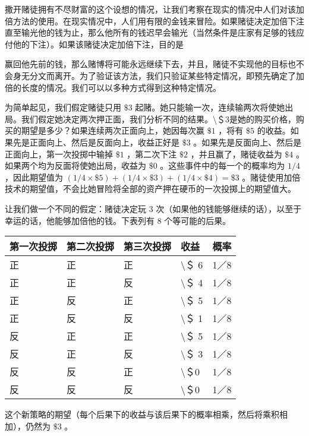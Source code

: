 撒开赌徒拥有不尽财富的这个设想的情况，让我们考察在现实的情况中人们对该加倍方法的使用。在现实情况中，人们用有限的金钱来冒险。如果赌徒决定加倍下注直至输光他的钱为止，那么他所有的钱迟早会输光（当然条件是庄家有足够的钱应付他的下注）。如果该赌徒决定加倍下注，目的是

赢回他先前的钱，那么赌博将可能永远继续下去，并且，赌徒不实现他的目标也不会身无分文而离开。为了验证该方法，我们只验证某些特定情况，即预先确定了加倍的长度的情况。我们可以以多种方式得到这种特定情况。

为简单起见，我们假定赌徒只用 $\$ 3$ 起赌。她只能输一次，连续输两次将使她出局。我们假定她决定两次押正面，我们分析不同的结果。\textbackslash ＄3是她的购买价格，购买的期望是多少？如果连续两次正面向上，她因每次赢 $\$ 1$ ，将有 $\$ 5$ 的收益。如果先是正面向上、然后是反面向上，收益正好是 $\$ 3$ 。如果先是反面向上、然后是正面向上，第一次投掷中输掉 $\$ 1$ ，第二次下注 $\$ 2$ ，并且赢了，赌徒收益为 $\$ 4$ 。如果两个均为反面将使她出局，收益为 $\$ 0$ 。这些事件中的每一个的概率均为 $1 / 4$ ，因此期望值为 $(1 / 4 \times \$ 5)+(1 / 4 \times \$ 3)+(1 / 4 \times \$ 4)=\$ 3$ 。赌徒使用加倍技术的期望值，不会比她冒险将全部的资产押在硬币的一次投掷上的期望值大。

让我们做一个不同的假定：赌徒决定玩 3 次（如果他的钱能够继续的话），以至于幸运的话，他能够加倍他的钱。下表列有 8 个等可能的后果。

\begin{center}
\begin{tabular}{|l|l|l|l|l|}
\hline
第一次投掷 & 第二次投掷 & 第三次投掷 & 收益 & 概率 \\
\hline
正 & 正 & 正 & \textbackslash ＄ 6 & 1／8 \\
\hline
正 & 正 & 反 & \textbackslash ＄ 4 & 1／8 \\
\hline
正 & 反 & 正 & \textbackslash ＄ 5 & 1／8 \\
\hline
正 & 反 & 反 & \textbackslash ＄ 1 & 1／8 \\
\hline
反 & 正 & 正 & \textbackslash ＄ 5 & 1／8 \\
\hline
反 & 正 & 反 & \textbackslash ＄ 3 & 1／8 \\
\hline
反 & 反 & 正 & \textbackslash ＄0 & 1／8 \\
\hline
反 & 反 & 反 & \textbackslash ＄0 & 1／8 \\
\hline
\end{tabular}
\end{center}

这个新策略的期望（每个后果下的收益与该后果下的概率相乘，然后将乘积相加），仍然为 $\$ 3$ 。

